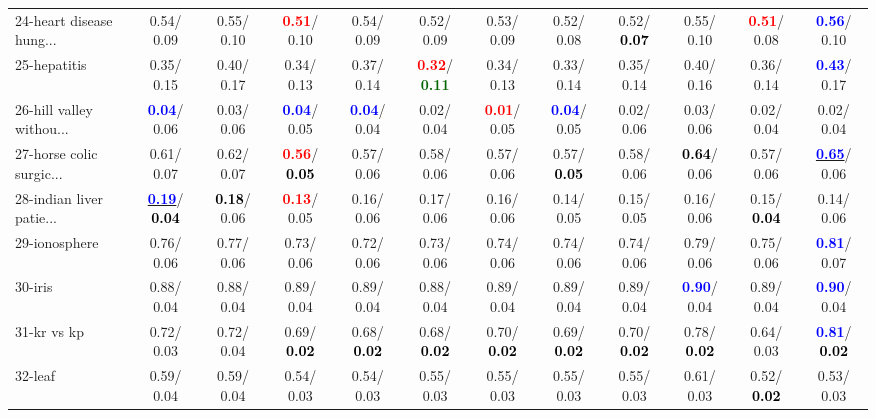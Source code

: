 \begin{table}[h]
\begin{center}
{\begin{tabular}{lc|c|c|c|c|c|c|c|c|c|c}
24-heart disease hung... &   0.54/  0.09 &   0.55/  0.10 & \textcolor{red}{\textbf{  0.51}}/  0.10 &   0.54/  0.09 &   0.52/  0.09 &   0.53/  0.09 &   0.52/  0.08 &   0.52/\textcolor{black}{\textbf{  0.07}} &   0.55/  0.10 & \textcolor{red}{\textbf{  0.51}}/  0.08 & \textcolor{blue}{\textbf{  0.56}}/  0.10 \\
25-hepatitis &   0.35/  0.15 &   0.40/  0.17 &   0.34/  0.13 &   0.37/  0.14 & \textcolor{red}{\textbf{  0.32}}/\textcolor{darkgreen}{\textbf{  0.11}} &   0.34/  0.13 &   0.33/  0.14 &   0.35/  0.14 &   0.40/  0.16 &   0.36/  0.14 & \textcolor{blue}{\textbf{  0.43}}/  0.17 \\
26-hill valley withou... & \textcolor{blue}{\textbf{  0.04}}/  0.06 &   0.03/  0.06 & \textcolor{blue}{\textbf{  0.04}}/  0.05 & \textcolor{blue}{\textbf{  0.04}}/  0.04 &   0.02/  0.04 & \textcolor{red}{\textbf{  0.01}}/  0.05 & \textcolor{blue}{\textbf{  0.04}}/  0.05 &   0.02/  0.06 &   0.03/  0.06 &   0.02/  0.04 &   0.02/  0.04 \\
27-horse colic surgic... &   0.61/  0.07 &   0.62/  0.07 & \textcolor{red}{\textbf{  0.56}}/\textcolor{black}{\textbf{  0.05}} &   0.57/  0.06 &   0.58/  0.06 &   0.57/  0.06 &   0.57/\textcolor{black}{\textbf{  0.05}} &   0.58/  0.06 & \textcolor{black}{\textbf{  0.64}}/  0.06 &   0.57/  0.06 & \underline{\textcolor{blue}{\textbf{  0.65}}}/  0.06 \\
28-indian liver patie... & \underline{\textcolor{blue}{\textbf{  0.19}}}/\textcolor{black}{\textbf{  0.04}} & \textcolor{black}{\textbf{  0.18}}/  0.06 & \textcolor{red}{\textbf{  0.13}}/  0.05 &   0.16/  0.06 &   0.17/  0.06 &   0.16/  0.06 &   0.14/  0.05 &   0.15/  0.05 &   0.16/  0.06 &   0.15/\textcolor{black}{\textbf{  0.04}} &   0.14/  0.06 \\ \hline
29-ionosphere &   0.76/  0.06 &   0.77/  0.06 &   0.73/  0.06 &   0.72/  0.06 &   0.73/  0.06 &   0.74/  0.06 &   0.74/  0.06 &   0.74/  0.06 &   0.79/  0.06 &   0.75/  0.06 & \textcolor{blue}{\textbf{  0.81}}/  0.07 \\
30-iris &   0.88/  0.04 &   0.88/  0.04 &   0.89/  0.04 &   0.89/  0.04 &   0.88/  0.04 &   0.89/  0.04 &   0.89/  0.04 &   0.89/  0.04 & \textcolor{blue}{\textbf{  0.90}}/  0.04 &   0.89/  0.04 & \textcolor{blue}{\textbf{  0.90}}/  0.04 \\
31-kr vs kp &   0.72/  0.03 &   0.72/  0.04 &   0.69/\textcolor{black}{\textbf{  0.02}} &   0.68/\textcolor{black}{\textbf{  0.02}} &   0.68/\textcolor{black}{\textbf{  0.02}} &   0.70/\textcolor{black}{\textbf{  0.02}} &   0.69/\textcolor{black}{\textbf{  0.02}} &   0.70/\textcolor{black}{\textbf{  0.02}} &   0.78/\textcolor{black}{\textbf{  0.02}} &   0.64/  0.03 & \textcolor{blue}{\textbf{  0.81}}/\textcolor{black}{\textbf{  0.02}} \\
32-leaf &   0.59/  0.04 &   0.59/  0.04 &   0.54/  0.03 &   0.54/  0.03 &   0.55/  0.03 &   0.55/  0.03 &   0.55/  0.03 &   0.55/  0.03 &   0.61/  0.03 &   0.52/\textcolor{black}{\textbf{  0.02}} &   0.53/  0.03 \\\end{tabular}
}\label{strats0aRFw}
\end{center}
\end{table}
